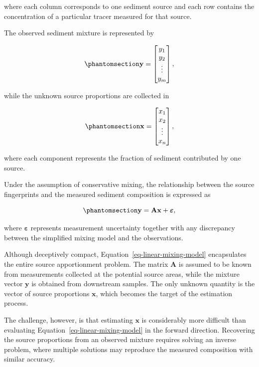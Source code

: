 \documentclass[
  12pt,
  letterpaper,
]{book}
\begin{document}
where each column corresponds to one sediment source and each row
contains the concentration of a particular tracer measured for that
source.

The observed sediment mixture is represented by

\begin{equation}\phantomsection\label{eq-mixture-vector}{
\mathbf{y} =
\begin{bmatrix}
y_1 \\
y_2 \\
\vdots \\
y_m
\end{bmatrix},
}\end{equation}

while the unknown source proportions are collected in

\begin{equation}\phantomsection\label{eq-source-proportions}{
\mathbf{x} =
\begin{bmatrix}
x_1 \\
x_2 \\
\vdots \\
x_n
\end{bmatrix},
}\end{equation}

where each component represents the fraction of sediment contributed by
one source.

Under the assumption of conservative mixing, the relationship between
the source fingerprints and the measured sediment composition is
expressed as

\begin{equation}\phantomsection\label{eq-linear-mixing-model}{
\mathbf{y}=\mathbf{A}\mathbf{x}+\boldsymbol{\varepsilon},
}\end{equation}

where \(\boldsymbol{\varepsilon}\) represents measurement uncertainty
together with any discrepancy between the simplified mixing model and
the observations.

Although deceptively compact, Equation~\ref{eq-linear-mixing-model}
encapsulates the entire source apportionment problem. The matrix
\(\mathbf{A}\) is assumed to be known from measurements collected at the
potential source areas, while the mixture vector \(\mathbf{y}\) is
obtained from downstream samples. The only unknown quantity is the
vector of source proportions \(\mathbf{x}\), which becomes the target of
the estimation process.

The challenge, however, is that estimating \(\mathbf{x}\) is
considerably more difficult than evaluating
Equation~\ref{eq-linear-mixing-model} in the forward direction.
Recovering the source proportions from an observed mixture requires
solving an inverse problem, where multiple solutions may reproduce the
measured composition with similar accuracy.
\end{document}
